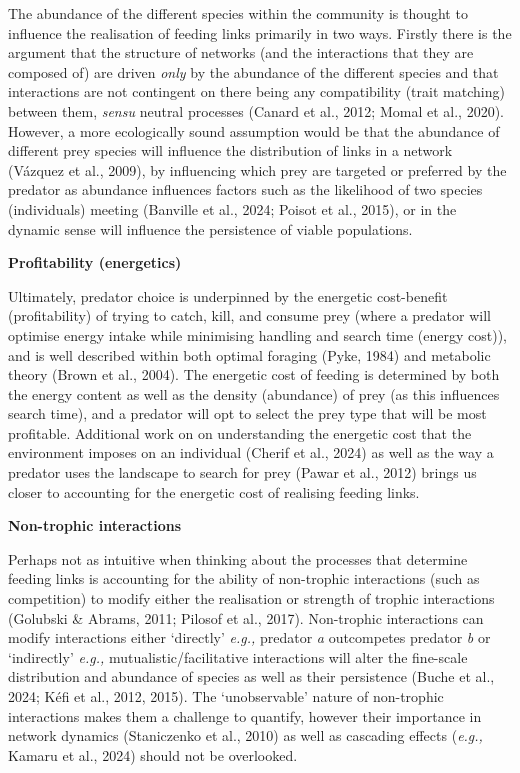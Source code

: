 \documentclass[
]{article}
\begin{document}
The abundance of the different species within the community is thought
to influence the realisation of feeding links primarily in two ways.
Firstly there is the argument that the structure of networks (and the
interactions that they are composed of) are driven \emph{only} by the
abundance of the different species and that interactions are not
contingent on there being any compatibility (trait matching) between
them, \emph{sensu} neutral processes (Canard et al., 2012; Momal et al.,
2020). However, a more ecologically sound assumption would be that the
abundance of different prey species will influence the distribution of
links in a network (Vázquez et al., 2009), by influencing which prey are
targeted or preferred by the predator as abundance influences factors
such as the likelihood of two species (individuals) meeting (Banville et
al., 2024; Poisot et al., 2015), or in the dynamic sense will influence
the persistence of viable populations.

\textbf{Profitability (energetics)}

Ultimately, predator choice is underpinned by the energetic cost-benefit
(profitability) of trying to catch, kill, and consume prey (where a
predator will optimise energy intake while minimising handling and
search time (energy cost)), and is well described within both optimal
foraging (Pyke, 1984) and metabolic theory (Brown et al., 2004). The
energetic cost of feeding is determined by both the energy content as
well as the density (abundance) of prey (as this influences search
time), and a predator will opt to select the prey type that will be most
profitable. Additional work on on understanding the energetic cost that
the environment imposes on an individual (Cherif et al., 2024) as well
as the way a predator uses the landscape to search for prey (Pawar et
al., 2012) brings us closer to accounting for the energetic cost of
realising feeding links.

\textbf{Non-trophic interactions}

Perhaps not as intuitive when thinking about the processes that
determine feeding links is accounting for the ability of non-trophic
interactions (such as competition) to modify either the realisation or
strength of trophic interactions (Golubski \& Abrams, 2011; Pilosof et
al., 2017). Non-trophic interactions can modify interactions either
`directly' \emph{e.g.,} predator \emph{a} outcompetes predator \emph{b}
or `indirectly' \emph{e.g.,} mutualistic/facilitative interactions will
alter the fine-scale distribution and abundance of species as well as
their persistence (Buche et al., 2024; Kéfi et al., 2012, 2015). The
`unobservable' nature of non-trophic interactions makes them a challenge
to quantify, however their importance in network dynamics (Staniczenko
et al., 2010) as well as cascading effects (\emph{e.g.,} Kamaru et al.,
2024) should not be overlooked.
\end{document}
